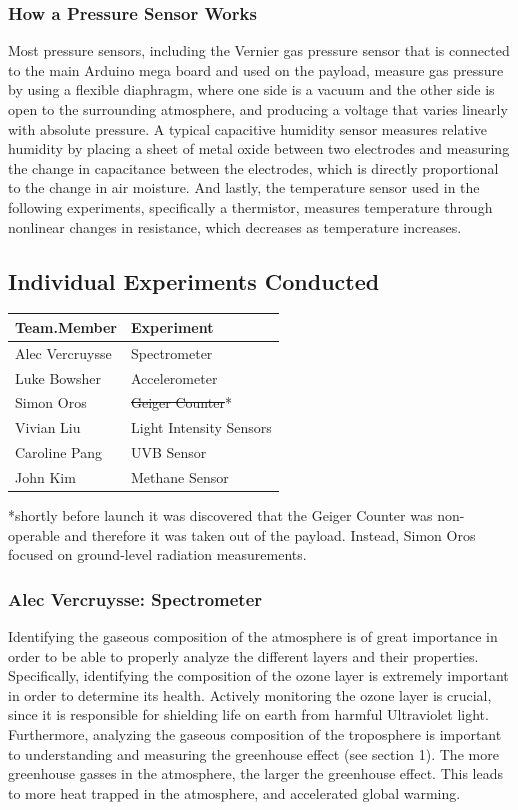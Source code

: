 \documentclass[12pt,]{article}
\begin{document}
\subsubsection{How a Pressure Sensor
Works}\label{how-a-pressure-sensor-works}

Most pressure sensors, including the Vernier gas pressure sensor that is
connected to the main Arduino mega board and used on the payload,
measure gas pressure by using a flexible diaphragm, where one side is a
vacuum and the other side is open to the surrounding atmosphere, and
producing a voltage that varies linearly with absolute pressure. A
typical capacitive humidity sensor measures relative humidity by placing
a sheet of metal oxide between two electrodes and measuring the change
in capacitance between the electrodes, which is directly proportional to
the change in air moisture. And lastly, the temperature sensor used in
the following experiments, specifically a thermistor, measures
temperature through nonlinear changes in resistance, which decreases as
temperature increases.

\subsection{Individual Experiments
Conducted}\label{individual-experiments-conducted}

\begin{longtable}[]{@{}ll@{}}
\toprule
Team.Member & Experiment\tabularnewline
\midrule
\endhead
Alec Vercruysse & Spectrometer\tabularnewline
Luke Bowsher & Accelerometer\tabularnewline
Simon Oros & \sout{Geiger Counter}*\tabularnewline
Vivian Liu & Light Intensity Sensors\tabularnewline
Caroline Pang & UVB Sensor\tabularnewline
John Kim & Methane Sensor\tabularnewline
\bottomrule
\end{longtable}

*shortly before launch it was discovered that the Geiger Counter was
non-operable and therefore it was taken out of the payload. Instead,
Simon Oros focused on ground-level radiation measurements.

\subsubsection{Alec Vercruysse:
Spectrometer}\label{alec-vercruysse-spectrometer}

Identifying the gaseous composition of the atmosphere is of great
importance in order to be able to properly analyze the different layers
and their properties. Specifically, identifying the composition of the
ozone layer is extremely important in order to determine its health.
Actively monitoring the ozone layer is crucial, since it is responsible
for shielding life on earth from harmful Ultraviolet light. Furthermore,
analyzing the gaseous composition of the troposphere is important to
understanding and measuring the greenhouse effect (see section 1). The
more greenhouse gasses in the atmosphere, the larger the greenhouse
effect. This leads to more heat trapped in the atmosphere, and
accelerated global warming.
\end{document}
